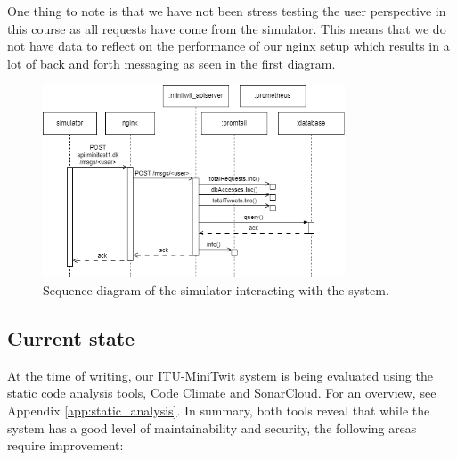 One thing to note is that we have not been stress testing the user perspective in this course as all requests have come from the simulator. This means that we do not have data to reflect on the performance of our nginx setup which results in a lot of back and forth messaging as seen in the first diagram. 

\begin{figure}[H]
    \centering
    \includegraphics[width=0.8\textwidth]{images/sequence-simulator.png}
    \caption{Sequence diagram of the simulator interacting with the system.}
    \label{fig:sim_sequence}
\end{figure}




\subsection{Current state}
\label{sec:current-state}

At the time of writing, our ITU-MiniTwit system is being evaluated using the static code analysis tools, Code Climate and SonarCloud.
For an overview, see Appendix \ref{app:static_analysis}. In summary, both tools reveal that while the system has a good level of maintainability and security, the following areas require improvement:

